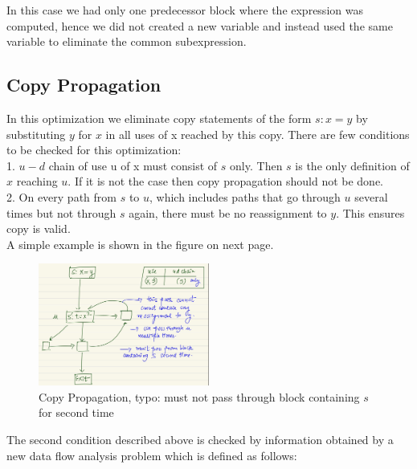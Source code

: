 \documentclass{article}
\begin{document}
In this case we had only one predecessor block where the expression was computed, hence we did not created a new variable and instead used the same variable to eliminate the common subexpression. \\

\subsection*{Copy Propagation}
In this optimization we eliminate copy statements of the form $s: x = y$ by substituting $y$ for $x$ in all uses of x reached by this copy. There are few conditions to be checked for this optimization: \\
1. $u-d$ chain of use u of x must consist of $s$ only. Then $s$ is the only definition of $x$ reaching $u$. If it is not the case then copy propagation should not be done. \\
2. On every path from $s$ to $u$, which includes paths that go through $u$ several times but not through $s$ again, there must be no reassignment to $y$. This ensures copy is valid. \\

A simple example is shown in the figure on next page. \\

\begin{figure}[h]
    \centering
    \includegraphics[width=0.5\textwidth]{Images/CP.jpeg}
    \caption{Copy Propagation, typo: must not pass through block containing $s$ for second time}
    \label{fig:CopyPropagation}
\end{figure}

\newpage

The second condition described above is checked by information obtained by a new data flow analysis problem which is defined as follows: \\
\end{document}
